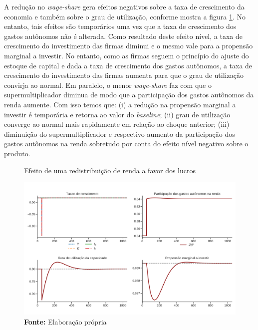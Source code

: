 A redução no \textit{wage-share} gera efeitos negativos sobre a taxa de crescimento da economia e também sobre o grau de utilização, conforme mostra a figura \ref{choque_2}. No entanto, tais efeitos são temporários uma vez que a taxa de crescimento dos gastos autônomos não é alterada. 
Como resultado deste efeito nível, a taxa de crescimento do investimento das firmas diminui e o mesmo vale para a propensão marginal a investir.
No entanto, como as firmas seguem o princípio do ajuste do estoque de capital e dada a taxa de crescimento dos gastos autônomos, a taxa de crescimento do investimento das firmas aumenta para que o grau de utilização convirja ao normal.
Em paralelo, o menor \textit{wage-share} faz com que o supermultiplicador diminua de modo que a participação dos gastos autônomos da renda aumente.
Com isso temos que: (i) a redução na propensão marginal a investir é temporária e retorna ao valor do \textit{baseline}; (ii) grau de utilização converge ao normal mais rapidamente em relação ao choque anterior; (iii) diminuição do supermultiplicador e respectivo aumento da participação dos gastos autônomos na renda sobretudo por conta do efeito nível negativo sobre o produto.


\begin{figure}[H]
	\centering
	\caption{Efeito de uma redistribuição de renda a favor dos lucros}
	\label{choque_2}
	\includegraphics[width=\textwidth]{../../Modelo/Versoes/Shock_2.png}
	\caption*{\textbf{Fonte:} Elaboração própria}
\end{figure}

